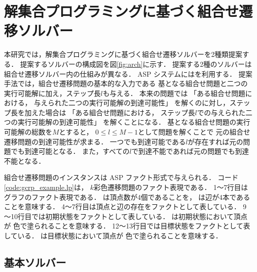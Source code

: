 \section{解集合プログラミングに基づく組合せ遷移ソルバー} \label{chap:proposal}


本研究では，解集合プログラミングに基づく組合せ遷移ソルバーを2種類提案する．
提案するソルバーの構成図を図\ref{fig:arch}に示す．
提案する2種のソルバーは組合せ遷移ソルバー内の仕組みが異なる．
ASP システムには{\clingo}を利用する．
提案手法では，組合せ遷移問題の基本的な入力である
基となる組合せ問題と二つの実行可能解に加え，ステップ長$l$も与える．
本来の問題では
「ある組合せ問題における，
与えられた二つの実行可能解の到達可能性」
を解くのに対し，ステップ長を加えた場合は
「ある組合せ問題における，
ステップ長$l$での与えられた二つの実行可能解の到達可能性」
を解くことになる．
基となる組合せ問題の実行可能解の総数を$M$とすると，
$0 \le l \le M-1$として問題を解くことで
元の組合せ遷移問題の到達可能性が求まる．
一つでも到達可能である$l$が存在すれば元の問題でも到達可能となる．
また，すべての$l$で到達不能であれば元の問題でも到達不能となる．

組合せ遷移問題のインスタンスは ASP ファクト形式で与えられる．
コード\ref{code:gcrp_example.lp}は，
$k$彩色遷移問題のファクト表現である．
1～7行目はグラフのファクト表現である．
は頂点数が4個であることを，
は辺が4本であることを意味する．
4～7行目は頂点と辺の存在をファクトとして表している．
9～10行目では初期状態をファクトとして表している．
は初期状態において頂点が
色で塗られることを意味する．
12～13行目では目標状態をファクトとして表している．
は目標状態において頂点が
色で塗られることを意味する．



\subsection{基本ソルバー} \label{sec:based_solver}

